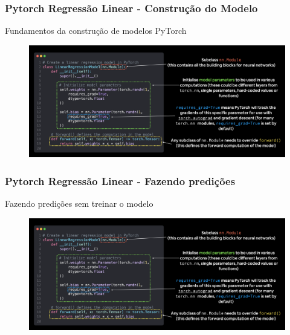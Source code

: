 \documentclass{beamer}
\begin{document}
\begin{frame}
\end{frame}
\begin{frame}
	\frametitle{Pytorch Regressão Linear - Construção do Modelo}
	\begin{block}{Fundamentos da construção de modelos PyTorch}
		\begin{figure}
			\centering
			\includegraphics[width=1\linewidth]{figures/basic_torch_implmentation}
		\end{figure}
		
	\end{block}
\end{frame}
\begin{frame}
	\frametitle{Pytorch Regressão Linear - Fazendo predições}
	\begin{block}{Fazendo predições sem treinar o modelo}
		\begin{figure}
			\centering
			\includegraphics[width=1\linewidth]{figures/basic_torch_implmentation}
		\end{figure}
		
	\end{block}
\end{frame}
\end{document}
